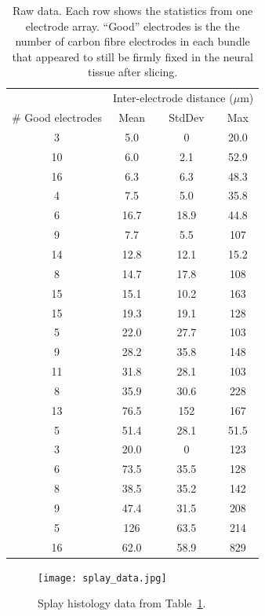 \documentclass[10pt,letterpaper]{article}
\begin{document}
\begin{table}
  \begin{tabular}{cccc}
    & \multicolumn{3}{c}{Inter-electrode distance ($\mu$m)} \\
    \# Good electrodes & Mean & StdDev & Max \\
    \hline
     3  &  5.0    &    0 &  20.0 \\
   10  &  6.0   & 2.1 &  52.9 \\
   16  &  6.3   & 6.3 &  48.3 \\
    4  &  7.5   & 5.0 &  35.8 \\
    6  & 16.7  & 18.9 &  44.8 \\
    9  &  7.7   & 5.5 & 107 \\
   14 &  12.8  & 12.1 & 15.2 \\
    8 &  14.7  & 17.8 & 108 \\
   15&   15.1  & 10.2 & 163 \\
   15  & 19.3  & 19.1 & 128 \\
    5  & 22.0  & 27.7 & 103 \\
    9  & 28.2   & 35.8 & 148 \\
   11 &  31.8  & 28.1 & 103 \\
    8  & 35.9  & 30.6 & 228 \\
   13 &  76.5 & 152 & 167 \\
    5  & 51.4  & 28.1 &  51.5 \\
    3  & 20.0    &     0 & 123 \\
    6  & 73.5  & 35.5 & 128 \\
    8  & 38.5  & 35.2 & 142 \\
    9  & 47.4  & 31.5 & 208 \\
    5 & 126  & 63.5&  214 \\
    16 &  62.0 &  58.9&  829
  \end{tabular}
  \caption{Raw data.  Each row shows the statistics from one electrode
    array.  ``Good'' electrodes is the the number of carbon fibre
    electrodes in each bundle that appeared to still be firmly fixed
    in the neural tissue after slicing.}
  \label{table:splaydata}
\end{table}

\begin{figure}
  \texttt{[image: splay\_data.jpg]}
  \caption{Splay histology data from Table~\ref{table:splaydata}.}
  \label{fig:splaydata}
\end{figure}
\end{document}

